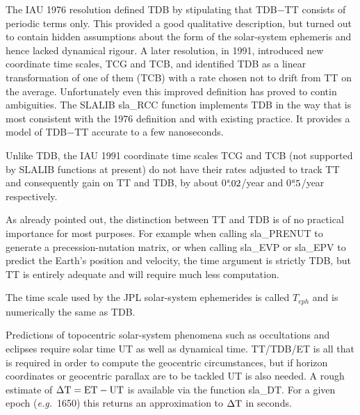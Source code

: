 \documentclass[11pt,twoside,nolof]{starlink}
\providecommand{\tseci}[1]   {$#1$\mbox{$^{\rm s}$}}
\providecommand{\tsec}[2]    {\tseci{#1}$\hspace{-0.3em}.#2$}
\begin{document}
The IAU 1976 resolution defined TDB by
stipulating that TDB$-$TT consists of periodic terms only.
This provided
a good qualitative description, but turned out to
contain hidden assumptions about the form of the
solar-system ephemeris and hence lacked dynamical
rigour.  A later resolution, in 1991, introduced new
coordinate time scales, TCG and TCB, and identified TDB as a
linear transformation of one of them (TCB) with a rate
chosen not to drift from TT on the average.  Unfortunately
even this improved definition has proved to
contin ambiguities.  The SLALIB
sla\_RCC function implements TDB in the way that is
most consistent with the 1976 definition and
with existing practice.  It provides a model of
TDB$-$TT accurate to a few nanoseconds.

Unlike TDB, the IAU 1991 coordinate time scales TCG and TCB
(not supported by SLALIB functions at present)
do not have their rates adjusted to track TT and consequently
gain on TT and TDB, by about
\tsec{0}{02}/year and \tsec{0}{5}/year respectively.

As already pointed out, the distinction between TT and TDB is
of no practical importance for most purposes.  For
example when calling
sla\_PRENUT
to generate a precession-nutation matrix, or when calling
sla\_EVP or
sla\_EPV
to predict the
Earth's position and velocity, the time argument is strictly
TDB, but TT is entirely adequate and will require much
less computation.

The time scale used by the JPL solar-system ephemerides is called
$T_{eph}$ and is numerically the same as TDB.

Predictions of topocentric solar-system phenomena such as
occultations and eclipses require solar time UT as well as dynamical
time.  TT/TDB/ET is all that is required in order to compute the geocentric
circumstances, but if horizon coordinates or geocentric parallax
are to be tackled UT is also needed.  A rough estimate
of $\Delta {\rm T} = {\rm ET} - {\rm UT}$ is
available via the function
sla\_DT.
For a given epoch (\textit{e.g.}\ 1650) this returns an approximation
to $\Delta {\rm T}$ in seconds.
\end{document}
